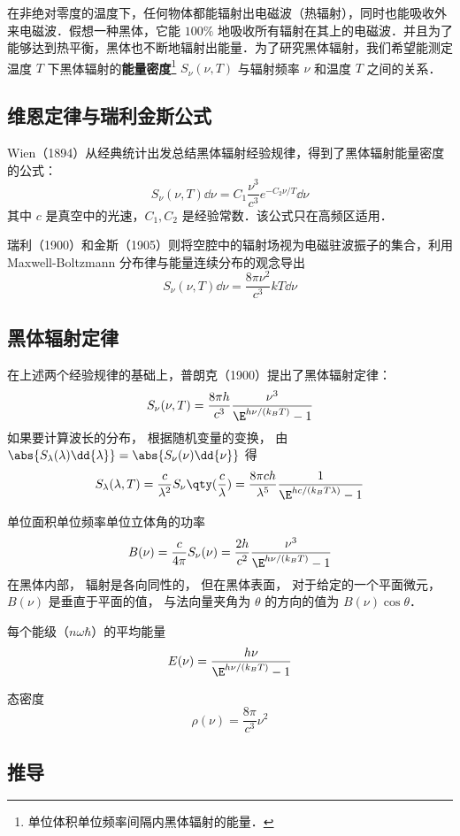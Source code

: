 
\begin{issues}
\issueDraft
\issueNeedCite
\end{issues}

在非绝对零度的温度下，任何物体都能辐射出电磁波（热辐射），同时也能吸收外来电磁波．假想一种黑体，它能 $100\%$ 地吸收所有辐射在其上的电磁波．并且为了能够达到热平衡，黑体也不断地辐射出能量．为了研究黑体辐射，我们希望能测定温度 $T$ 下黑体辐射的\textbf{能量密度}\footnote{单位体积单位频率间隔内黑体辐射的能量．} $S_\nu(\nu,T)$ 与辐射频率 $\nu$ 和温度 $T$ 之间的关系．

\subsection{维恩定律与瑞利金斯公式}
Wien（1894）从经典统计出发总结黑体辐射经验规律，得到了黑体辐射能量密度的公式：
\begin{equation}
S_\nu(\nu,T)\dd \nu=C_1 \frac{\nu^3}{c^3}e^{-C_2\nu/T}\dd \nu
\end{equation}
其中 $c$ 是真空中的光速，$C_1,C_2$ 是经验常数．该公式只在高频区适用．

瑞利（1900）和金斯（1905）则将空腔中的辐射场视为电磁驻波振子的集合，利用 Maxwell-Boltzmann 分布律与能量连续分布的观念导出
\begin{equation}
S_\nu(\nu,T)\dd \nu=\frac{8\pi\nu^2}{c^3}kT\dd \nu
\end{equation}


\subsection{黑体辐射定律}
在上述两个经验规律的基础上，普朗克（1900）提出了黑体辐射定律：
\begin{equation}
S_\nu(\nu,T) = \frac{8\pi h}{c^3}\frac{\nu^3}{\E^{h\nu/(k_B T)} - 1}
\end{equation}
如果要计算波长的分布， 根据随机变量的变换， 由 $\abs{S_\lambda(\lambda) \dd{\lambda}} = \abs{S_\nu(\nu)\dd{\nu}}$ 得
\begin{equation}\label{BBdLaw_eq1}
S_\lambda(\lambda,T) = \frac{c}{\lambda^2}S_\nu\qty(\frac{c}{\lambda}) =
\frac{8\pi ch}{\lambda^5} \frac{1}{\E^{hc/(k_B T\lambda)} - 1}
\end{equation}

单位面积单位频率单位立体角的功率
\begin{equation}\label{BBdLaw_eq2}
B(\nu) = \frac{c}{4\pi}S_\nu(\nu) = \frac{2h}{c^2} \frac{\nu^3}{\E^{h\nu/(k_B T)} - 1}
\end{equation}
在黑体内部， 辐射是各向同性的， 但在黑体表面， 对于给定的一个平面微元， $B(\nu)$ 是垂直于平面的值， 与法向量夹角为 $\theta$ 的方向的值为 $B(\nu)\cos\theta$．

每个能级（$n\omega\hbar$）的平均能量
\begin{equation}
E(\nu) = \frac{h\nu}{\E^{h\nu/(k_B T)} - 1}
\end{equation}

态密度
\begin{equation}
\rho(\nu) = \frac{8\pi}{c^3}\nu^2
\end{equation}

\subsection{推导}
